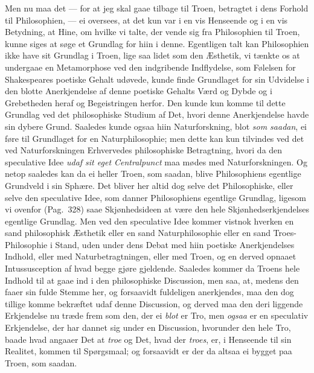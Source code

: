 \documentclass[12pt,a4paper]{book}
\newcommand{\apage}[1]{\marginnote{\footnotesize\textit{[#1]}}}
\begin{document}
Men nu maa det --- for at jeg skal gaae tilbage til Troen, \apage{62} betragtet i
dens Forhold til Philosophien, --- ei oversees, at det kun var i en vis
Henseende og i en vis Betydning, at Hine, om hvilke vi talte, der vende
sig fra Philosophien til Troen, kunne siges at søge et Grundlag for
hiin i denne. Egentligen talt kan Philosophien ikke have sit Grundlag i
Troen, lige saa lidet som den Æsthetik, vi tænkte os at undergaae en
Metamorphose ved den indgribende Indflydelse, som Følelsen for
Shakespeares poetiske Gehalt udøvede, kunde finde Grundlaget for sin
Udvidelse i den blotte Anerkjendelse af denne poetiske Gehalts Værd og
Dybde og i Grebetheden heraf og Begeistringen herfor. Den kunde kun
komme til dette Grundlag ved det philosophiske Studium af Det, hvori
denne Anerkjendelse havde sin dybere Grund. Saaledes kunde ogsaa hiin
Naturforskning, blot \emph{som saadan}, ei føre til Grundlaget for en
Naturphilosophie; men dette kan kun tilvindes ved det ved
Naturforskningen Erhvervedes philosophiske Betragtning, hvori da den
speculative Idee \emph{udaf sit eget Centralpunct} maa mødes med
Naturforskningen. Og netop saaledes kan da ei heller Troen, som saadan,
blive Philosophiens egentlige
Grundveld i sin Sphære. Det bliver her
altid dog selve det Philosophiske, eller selve den speculative Idee,
som danner Philosophiens egentlige Grundlag, ligesom vi ovenfor (Pag.\
328) saae Skjønhedsideen at være den hele Skjønhedserkjendelses
egentlige Grundlag. Men ved den speculative Idee kommer vistnok hverken
en sand philosophisk Æsthetik eller en sand Naturphilosophie eller en
sand Troes-Philosophie i Stand, uden under dens Debat med hiin poetiske
Anerkjendelses Indhold, eller med Naturbetragtningen, eller med Troen,
og en derved opnaaet Intussusception af hvad begge gjøre gjeldende.
Saaledes kommer da Troens hele Indhold til at gaae ind i den
philosophiske Discussion, men saa, at, medens den faaer sin fulde
Stemme her, og forsaavidt fuldeligen anerkjendes, maa den dog tillige
komme bekræftet udaf denne Discussion, og derved maa den deri liggende
Erkjendelse nu træde frem som den, der ei \apage{63} \emph{blot} er Tro, men \emph{ogsaa} er
en speculativ Erkjendelse, der har dannet sig under en Discussion,
hvorunder den hele Tro, baade hvad angaaer Det at \emph{troe} og Det, hvad der
\emph{troes}, er, i Henseende til sin Realitet, kommen til Spørgsmaal; og
forsaavidt er der da altsaa ei bygget paa Troen, som saadan.
\end{document}
